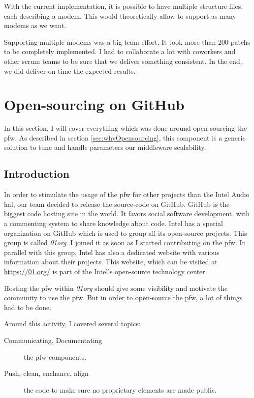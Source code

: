 With the current implementation, it is possible to have multiple structure files, each describing a modem. This would theoretically allow
to support as many modems as we want.

Supporting multiple modems was a big team effort. It took more than 200 patchs to be completely implemented.
I had to collaborate a lot with coworkers and other \gls{scrum} teams to be sure that we deliver something consistent.
In the end, we did deliver on time the expected results.


\newpage


\section{Open-sourcing on GitHub}

In this section, I will cover everything which was done around open-sourcing the \gls{pfw}.
As described in section \ref{sec:whyOpensourcing}, this component is a generic solution to tune and handle parameters
our middleware scalability.

\subsection{Introduction}
In order to stimulate the usage of the \gls{pfw} for other projects than the Intel Audio \gls{hal},
our team decided to release the source-code on \gls{GitHub}.
\gls{GitHub} is the biggest code hosting site in the world. It favors social software development, with a commenting system
to share knowledge about code.
Intel has a special organization on \gls{GitHub} which is used to group all its open-source projects. This group is called \emph{01org}. I
joined it as soon as I started contributing on the \gls{pfw}.
In parallel with this group, Intel has also a dedicated website with various information about their projects. This website, which can be
visited at \url{https://01.org/} is part of the Intel's open-source technology center.

Hosting the \gls{pfw} within \emph{01org} should give some visibility and motivate
the community to use the \gls{pfw}. But in order to open-source the \gls{pfw}, a lot of things had to be done.

Around this activity, I covered several topics:
\begin{description}
    \item[Communicating, Documentating] the \gls{pfw} components.
    \item[Push, clean, enchance, align] the code to make sure no proprietary
        elements are made public.
\end{description}

